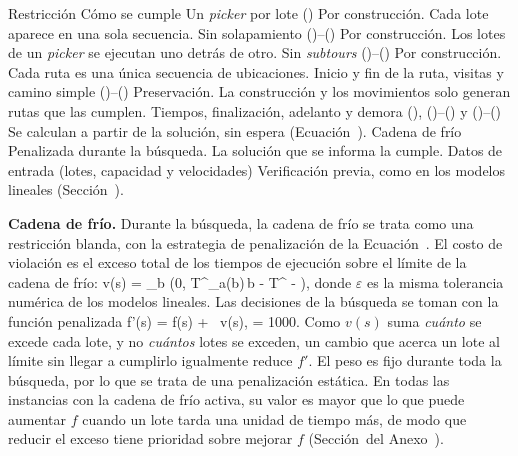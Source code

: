 \startplacetable[reference=tab:heur_restricciones, location=here, title={Cómo cumplen las metaheurísticas las restricciones de los modelos lineales.}]
\bTABLE[split=yes, align=middle, frame=on, width=fit]
\setupTABLE[row][1][background=color, backgroundcolor=darkgray, style=bold]
\setupTABLE[column][1][width=6cm, align=flushleft]
\setupTABLE[column][2][width=7.6cm, align=flushleft]
\bTR \bTH Restricción \eTH \bTH Cómo se cumple \eTH \eTR
\bTR \bTD Un {\em picker} por lote () \eTD \bTD Por construcción. Cada lote aparece en una sola secuencia. \eTD \eTR
\bTR \bTD Sin solapamiento ()--() \eTD \bTD Por construcción. Los lotes de un {\em picker} se ejecutan uno detrás de otro. \eTD \eTR
\bTR \bTD Sin {\em subtours} ()--() \eTD \bTD Por construcción. Cada ruta es una única secuencia de ubicaciones. \eTD \eTR
\bTR \bTD Inicio y fin de la ruta, visitas y camino simple ()--() \eTD \bTD Preservación. La construcción y los movimientos solo generan rutas que las cumplen. \eTD \eTR
\bTR \bTD Tiempos, finalización, adelanto y demora (), ()--(\in[eq:mono_cb]) y ()--() \eTD \bTD Se calculan a partir de la solución, sin espera (Ecuación~\in[eq:hc_finalizacion]). \eTD \eTR
\bTR \bTD Cadena de frío \eTD \bTD Penalizada durante la búsqueda. La solución que se informa la cumple. \eTD \eTR
\bTR \bTD Datos de entrada (lotes, capacidad y velocidades) \eTD \bTD Verificación previa, como en los modelos lineales (Sección~). \eTD \eTR
\eTABLE
\stopplacetable

{\bf Cadena de frío.} Durante la búsqueda, la cadena de frío se trata como
una restricción blanda, con la estrategia de penalización de la
Ecuación~\in[eq:penalizacion]. El costo de violación es el exceso total de
los tiempos de ejecución sobre el límite de la cadena de frío:
\startplaceformula[reference=eq:hc_violacion]
\startformula
	v(s) = \sum_{b \in {}} \max\left(0,\; T^{}_{a(b)\,b} - T^{} - \varepsilon\right),
\stopformula
\stopplaceformula
donde $\varepsilon$ es la misma tolerancia numérica de los modelos lineales.
Las decisiones de la búsqueda se toman con la función penalizada
\startplaceformula[reference=eq:hc_costo]
\startformula
	f'(s) = f(s) + \lambda \, v(s), \qquad \lambda = 1000.
\stopformula
\stopplaceformula
Como $v(s)$ suma {\em cuánto} se excede cada lote, y no {\em cuántos} lotes
se exceden, un cambio que acerca un lote al límite sin llegar a cumplirlo
igualmente reduce $f'$. El peso es fijo durante toda la búsqueda, por lo que
se trata de una penalización estática. En todas las instancias con la
cadena de frío activa, su valor es mayor que lo que puede aumentar $f$ cuando un
lote tarda una unidad de tiempo más, de modo que
reducir el exceso tiene prioridad sobre mejorar $f$
(Sección~ del Anexo~).

